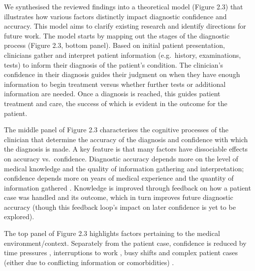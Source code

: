 \documentclass[a4paper, nobind]{templates/ociamthesis}
\begin{document}
We synthesised the reviewed findings into a theoretical model (Figure 2.3) that illustrates how various factors distinctly impact diagnostic confidence and accuracy. This model aims to clarify existing research and identify directions for future work. The model starts by mapping out the stages of the diagnostic process (Figure 2.3, bottom panel). Based on initial patient presentation, clinicians gather and interpret patient information (e.g.~history, examinations, tests) to inform their diagnosis of the patient's condition. The clinician's confidence in their diagnosis guides their judgment on when they have enough information to begin treatment versus whether further tests or additional information are needed. Once a diagnosis is reached, this guides patient treatment and care, the success of which is evident in the outcome for the patient.

The middle panel of Figure 2.3 characterises the cognitive processes of the clinician that determine the accuracy of the diagnosis and confidence with which the diagnosis is made. A key feature is that many factors have dissociable effects on accuracy vs.~confidence. Diagnostic accuracy depends more on the level of medical knowledge and the quality of information gathering and interpretation; confidence depends more on years of medical experience and the quantity of information gathered \autocite{kostopoulou_information_2012,hautz_accuracy_2019,mamede_role_2024}. Knowledge is improved through feedback on how a patient case was handled and its outcome, which in turn improves future diagnostic accuracy (though this feedback loop's impact on later confidence is yet to be explored).

The top panel of Figure 2.3 highlights factors pertaining to the medical environment/context. Separately from the patient case, confidence is reduced by time pressures \autocite{yang_effect_2012}, interruptions to work \autocite{soares_accuracy_2019}, busy shifts \autocite{gupta_associations_2023} and complex patient cases (either due to conflicting information or comorbidities) \autocite{meyer_physicians_2013,hausmann_sensitivity_2019,li_relationship_2023}.
\end{document}

